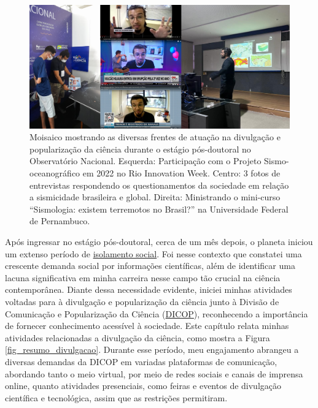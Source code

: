 \documentclass[10pt,a4paper,oneside]{book}
\newcommand{\HeroFigPad}{\vspace{-1cm}}
\begin{document}
\begin{figure}[h]
  \HeroFigPad
  \begin{center}
    \includegraphics[width=\textwidth]{images/atuacao_divulga.png}
  \end{center}
  \caption{
    Moisaico mostrando as diversas frentes de atuação na divulgação e popularização da ciência durante o estágio pós-doutoral no Observatório Nacional. Esquerda: Participação com o Projeto Sismo-oceanográfico em 2022 no Rio Innovation Week. Centro: 3 fotos de entrevistas respondendo os questionamentos da sociedade em relação a sismicidade brasileira e global. Direita: Ministrando o mini-curso “Sismologia: existem terremotos no Brasil?” na Universidade Federal de Pernambuco.}
\end{figure}

Após ingressar no estágio pós-doutoral, cerca de um mês depois, o planeta iniciou um extenso período de \href{http://repositoriocovid19.unb.br/repositorio-produtos/desvelando-o-isolamento-social-no-cotidiano-vivido-na-pandemia-da-covid-19/}{isolamento social}. Foi nesse contexto que constatei uma crescente demanda social por informações científicas, além de identificar uma lacuna significativa em minha carreira nesse campo tão crucial na ciência contemporânea. Diante dessa necessidade evidente, iniciei minhas atividades voltadas para à divulgação e popularização da ciência junto à Divisão de Comunicação e Popularização da Ciência (\href{https://www.gov.br/observatorio/pt-br/assuntos/areas-de-atuacao/divulgacao-e-popularizacao-da-ciencia}{DICOP}), reconhecendo a importância de fornecer conhecimento acessível à sociedade. Este capítulo relata minhas atividades relacionadas a divulgação da ciência, como mostra a Figura \ref{fig_resumo_divulgacao}. Durante esse período, meu engajamento abrangeu a diversas demandas da DICOP em variadas plataformas de comunicação, abordando tanto o meio virtual, por meio de redes sociais e canais de imprensa online, quanto atividades presenciais, como feiras e eventos de divulgação científica e tecnológica, assim que as restrições permitiram.
\end{document}
